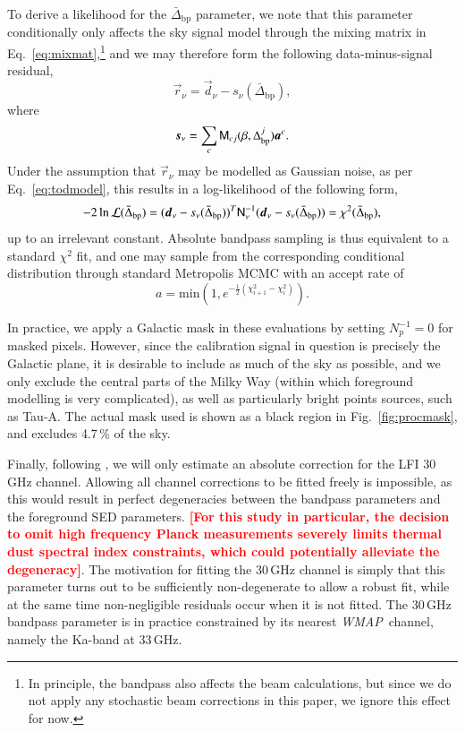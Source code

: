 \documentclass[twocolumn]{aa}
\def\WMAP{\textit{WMAP}}
\renewcommand{\d}[0]{\vec{d}}
\newcommand{\s}[0]{\vec{s}}
\renewcommand{\a}[0]{\vec{a}}
\newcommand{\N}[0]{\tens{N}}
\newcommand{\M}[0]{\tens{M}}
\renewcommand{\r}[0]{\vec{r}}
\newcommand{\Dbp}[0]{\Delta_{\mathrm{bp}}}
\newcommand{\?}[1]{\textcolor{red}{{\bf [#1]}}}
\begin{document}
To derive a likelihood for the $\bar{\Delta}_{\mathrm{bp}}$ parameter,
we note that this parameter conditionally only affects the sky signal
model through the mixing matrix in Eq.~\eqref{eq:mixmat},\footnote{In
  principle, the bandpass also affects the beam calculations, but
  since we do not apply any stochastic beam corrections in this paper,
  we ignore this effect for now.} and we may therefore form the
following data-minus-signal residual,
\begin{equation}
  \r_{\nu} = \d_{\nu}-s_{\nu}(\bar{\Delta}_{\mathrm{bp}}),
\end{equation}
where 
\begin{equation}
  \s_{\nu} = \sum_{c} \M_{cj}(\beta, \Dbp^{j})\a^c.
\end{equation}
Under the assumption that $\r_{\nu}$ may be modelled as Gaussian
noise, as per Eq.~\eqref{eq:todmodel}, this results in a
log-likelihood of the following form,
\begin{equation}
  -2\ln \mathcal{L}(\bar{\Delta}_{\mathrm{bp}}) =
  (\d_{\nu}-s_{\nu}(\bar{\Delta}_{\mathrm{bp}}))^T\N_{\nu}^{-1}(\d_{\nu}-s_{\nu}(\bar{\Delta}_{\mathrm{bp}}))
  = \chi^2(\bar{\Delta}_{\mathrm{bp}}),
  \label{eq:chisq}
\end{equation}
up to an irrelevant constant. Absolute bandpass sampling is thus
equivalent to a standard $\chi^2$ fit, and one may sample from the
corresponding conditional distribution through standard Metropolis
MCMC with an accept rate of
\begin{equation}
  a = \mathrm{min}(1,e^{-\frac{1}{2}(\chi^2_{i+1}-\chi^2_{i})}).
  \label{eq:metropolis}
\end{equation}

In practice, we apply a Galactic mask in these evaluations by setting
$N_{p}^{-1}=0$ for masked pixels. However, since the calibration signal in
question is precisely the Galactic plane, it is desirable to include
as much of the sky as possible, and we only exclude the central parts
of the Milky Way (within which foreground modelling is very
complicated), as well as particularly bright points sources, such as
Tau-A. The actual mask used is shown as a black region in
Fig.~\ref{fig:procmask}, and excludes 4.7\,\% of the sky.

Finally, following \citet{planck2014-a12}, we will only estimate an absolute
correction for the LFI 30\,GHz channel. Allowing all channel corrections to be
fitted freely is impossible, as this would result in perfect degeneracies
between the bandpass parameters and the foreground SED parameters. \?{\textbf{For
this study in particular, the decision to omit high frequency Planck
measurements severely limits thermal dust spectral index constraints, which
could potentially alleviate the degeneracy}}. The motivation for fitting the 30\,GHz channel
is simply that this parameter turns out to be sufficiently non-degenerate to
allow a robust fit, while at the same time non-negligible residuals occur when
it is not fitted. The 30\,GHz bandpass parameter is in practice constrained by
its nearest \WMAP\ channel, namely the Ka-band at 33\,GHz.
\end{document}

